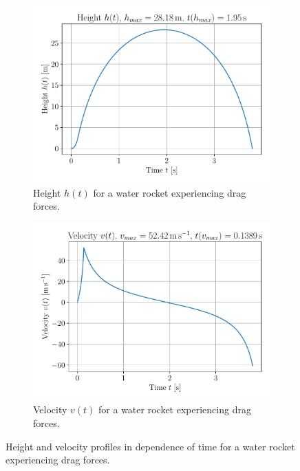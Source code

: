 \documentclass[a4paper,11pt]{report}
\begin{document}
\begin{figure}[h]
	\begin{subfigure}{0.49\textwidth}
		\centering
		\includegraphics[width=\textwidth]{figures/h(t)_with_drag.pdf}
		\caption{Height $h(t)$ for a water rocket experiencing drag forces.}
		\label{fig:h(t)_with_drag}
	\end{subfigure} \hfill
	\begin{subfigure}{0.49\textwidth}
		\centering
		\includegraphics[width=\textwidth]{figures/v(t)_with_drag.pdf}
		\caption{Velocity $v(t)$ for a water rocket experiencing drag forces.}
		\label{fig:v(t)_with_drag}
	\end{subfigure}
	\caption{Height and velocity profiles in dependence of time for a water rocket experiencing drag forces.}
	\label{fig:results1_with_drag}
\end{figure}
\end{document}

